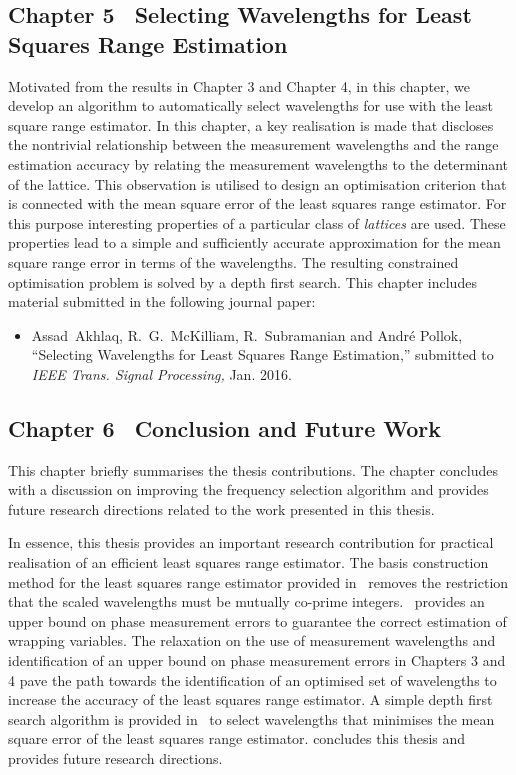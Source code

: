 \subsection*{Chapter 5 \textemdash~Selecting Wavelengths for Least Squares Range Estimation }
Motivated from the results in Chapter 3 and Chapter 4, in this chapter, we develop an algorithm to automatically select wavelengths for use with the least square range estimator. In this chapter, a key realisation is made that discloses the nontrivial relationship between the measurement wavelengths and the range estimation accuracy by relating the measurement wavelengths to the determinant of the lattice. This observation is utilised to design an optimisation criterion that is connected with the mean square error of the least squares range estimator. For this purpose interesting properties of a particular class of \emph{lattices} are used. These properties lead to a simple and sufficiently accurate approximation for the mean square range error in terms of the wavelengths. The resulting constrained optimisation problem is solved by a depth first search. \newline
This chapter includes material submitted in the following journal paper:
\newline
\begin{itemize}
\item{Assad~Akhlaq, R.~G.~McKilliam, R.~Subramanian and Andr\'e Pollok, ``{Selecting Wavelengths for Least Squares Range Estimation},'' submitted to \emph{IEEE Trans. Signal Processing,}  Jan. 2016.}
\end{itemize}

\subsection*{Chapter 6 \textemdash~Conclusion and Future Work}
This chapter briefly summarises the thesis contributions. The chapter concludes with a discussion on improving the frequency selection algorithm and provides future research directions related to the work presented in this thesis.

In essence, this thesis provides an important research contribution for practical realisation of an efficient least squares range estimator. The basis construction method for the least squares range estimator provided in~ removes the restriction that the scaled wavelengths must be mutually co-prime integers.~ provides an upper bound on phase measurement errors to guarantee the correct estimation of wrapping variables. The relaxation on the use of measurement wavelengths and identification of an upper bound on phase measurement errors in Chapters 3 and 4 pave the path towards the identification of an optimised set of wavelengths to increase the accuracy of the least squares range estimator. A simple depth first search algorithm is provided in~ to select wavelengths that minimises the mean square error of the least squares range estimator.  concludes this thesis and provides future research directions.
